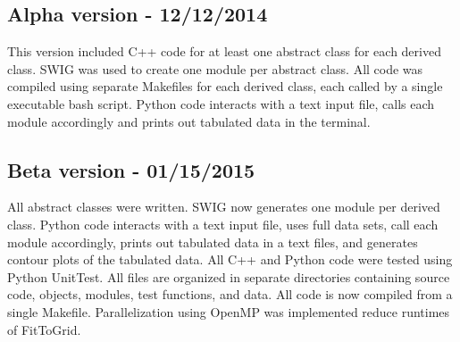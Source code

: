 \documentclass[11pt]{article}
\begin{document}
\subsection{Alpha version - 12/12/2014}
This version included C++ code for at least one abstract class for each derived class. SWIG was used to create one module per abstract class. All code was compiled using separate Makefiles for each derived class, each called by a single executable bash script. Python code interacts with a text input file, calls each module accordingly and prints out tabulated data in the terminal.

\subsection{Beta version - 01/15/2015}
All abstract classes were written. SWIG now generates one module per derived class. Python code interacts with a text input file, uses full data sets, call each module accordingly, prints out tabulated data in a text files, and generates contour plots of the tabulated data. All C++ and Python code were tested using Python UnitTest. All files are organized in separate directories containing source code, objects, modules, test functions, and data. All code is now compiled from a single Makefile. Parallelization using OpenMP was implemented reduce runtimes of FitToGrid.
\end{document}
